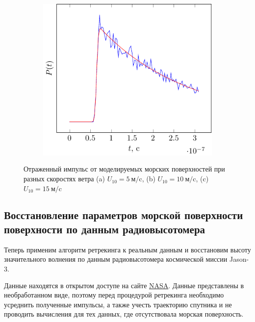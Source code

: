 \begin{figure}[ht]
\begin{subfigure}{0.49\linewidth}
    \end{subfigure}
    \begin{subfigure}{0.49\linewidth}
        \centering
        \includegraphics[width=\linewidth,page=2]{fig/retracking/model}
    \end{subfigure}
    \caption{Отраженный импульс от моделируемых морских поверхностей при разных
    скоростях ветра (a) $U_{10}=5 ~\text{м}/\text{c}$, (b) $U_{10}=10
~\text{м}/\text{c}$, (c) $U_{10}=15 ~\text{м}/\text{c}$}
    \label{fig:model_pulse_retracking}
\end{figure}






\subsection{Восстановление параметров морской поверхности поверхности по данным
радиовысотомера}


Теперь применим алгоритм ретрекинга к реальным данным и восстановим высоту
значительного волнения по данным радиовысотомера космической миссии Jason-3. 

Данные находятся в открытом доступе на сайте
\href{https://data.nodc.noaa.gov/jason3/gdr}{NASA}. 
Данные представлены в необработанном виде, поэтому перед процедурой ретрекинга
необходимо усреднить полученные импульсы, а также учесть траекторию спутника и
не проводить вычисления для тех данных, где отсутствовала морская поверхность.


